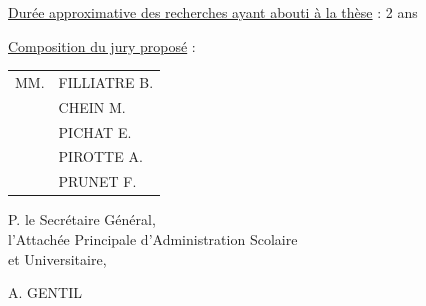 \uline{Durée approximative des recherches ayant abouti à la thèse} : 2 ans

\uline{Composition du jury proposé} :

\begin{tabular}{ll}
MM. & FILLIATRE B.\\
& CHEIN M.\\
& PICHAT E.\\
& PIROTTE A.\\
& PRUNET F.
\end{tabular}

\begin{center}
P. le Secrétaire Général,\\
l'Attachée Principale d'Administration Scolaire\\
et Universitaire,


A. GENTIL
\end{center}

